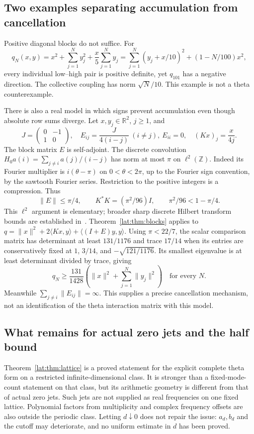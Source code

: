 \documentclass[11pt,a4paper]{article}
\numberwithin{equation}{section}
\theoremstyle{definition}\newtheorem{definition}[theorem]{Definition}
\theoremstyle{remark}\newtheorem{remark}[theorem]{Remark}
\newcommand{\R}{\mathbb R}\newcommand{\C}{\mathbb C}\newcommand{\N}{\mathbb N}
\newcommand{\ip}[2]{\langle#1,#2\rangle}\newcommand{\norm}[1]{\lVert#1\rVert}\newcommand{\abs}[1]{\lvert#1\rvert}
\begin{document}
\subsection{Two examples separating accumulation from cancellation}
Positive diagonal blocks do not suffice. For
\[
 q_N(x,y)=x^2+\sum_{j=1}^Ny_j^2+\frac{x}{5}\sum_{j=1}^Ny_j
 =\sum_{j=1}^N(y_j+x/10)^2+(1-N/100)x^2,
\]
every individual low--high pair is positive definite, yet $q_{101}$ has a
negative direction. The collective coupling has norm $\sqrt N/10$.
This example is not a theta counterexample.

There is also a real model in which signs prevent accumulation even though
absolute row sums diverge. Let $x,y_j\in\R^2$, $j\ge1$, and
\[
 J=\begin{pmatrix}0&-1\\1&0\end{pmatrix},\quad
 E_{ij}=\frac{J}{4(i-j)}\ (i\ne j),\ E_{ii}=0,
 \quad (Kx)_j=\frac{x}{4j}.
\]
The block matrix $E$ is self-adjoint. The discrete convolution
$H_0a(i)=\sum_{j\ne i}a(j)/(i-j)$ has norm at most $\pi$ on $\ell^2(\mathbb Z)$.
Indeed its Fourier multiplier is $i(\theta-\pi)$ on $0<\theta<2\pi$,
up to the Fourier sign convention, by the sawtooth Fourier series.
Restriction to the positive integers is a compression. Thus
\[
 \norm E\le\pi/4,\qquad K^*K=(\pi^2/96)I,
 \qquad \pi^2/96<1-\pi/4.
\]
This $\ell^2$ argument is elementary; broader sharp discrete Hilbert
transform bounds are established in~\cite{Hilbert}.
Theorem~\ref{lat:thm:blocks} applies to
$q=\norm x^2+2\ip{Kx}y+\ip{(I+E)y}y$.
Using $\pi<22/7$, the scalar comparison matrix has determinant at least
$131/1176$ and trace $17/14$ when its entries are conservatively fixed at
$1$, $3/14$, and $-\sqrt{121/1176}$. Its smallest eigenvalue is at least
determinant divided by trace, giving
\[
 \boxed{q_N\ge\frac{131}{1428}
       \left(\norm x^2+\sum_{j=1}^N\norm{y_j}^2\right)
       \quad\text{for every }N.}
\]
Meanwhile $\sum_{j\ne i}\norm{E_{ij}}=\infty$.
This supplies a precise cancellation mechanism, not an identification of
the theta interaction matrix with this model.

\subsection{What remains for actual zero jets and the half bound}
Theorem~\ref{lat:thm:lattice} is a proved statement for the explicit complete
theta form on a restricted infinite-dimensional class. It is stronger than
a fixed-mode-count statement on that class, but its arithmetic geometry is
different from that of actual zero jets. Such jets are not supplied as
real frequencies on one fixed lattice. Polynomial factors from multiplicity
and complex frequency offsets are also outside the periodic class.
Letting $d\downarrow0$ does not repair the issue: $a_d,b_d$ and the cutoff
may deteriorate, and no uniform estimate in $d$ has been proved.
\end{document}
